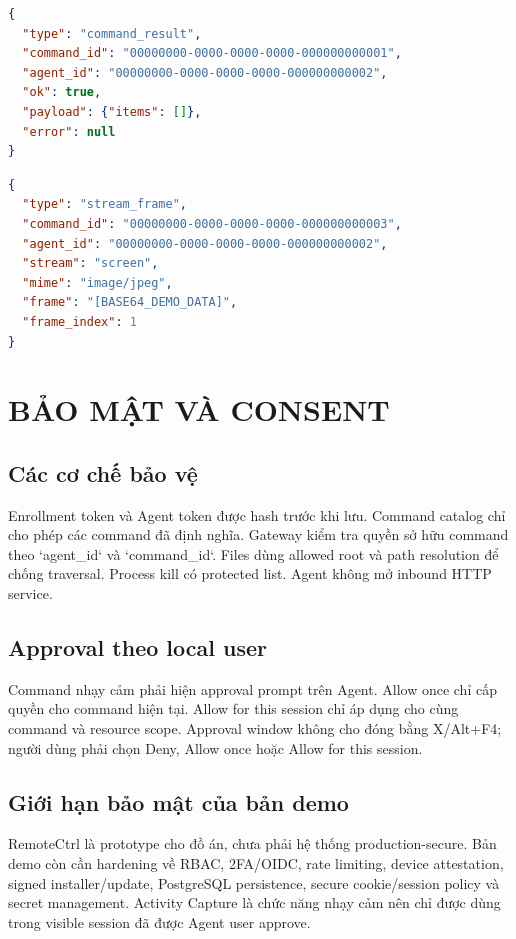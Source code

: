 \documentclass[12pt,a4paper]{article}
\begin{document}
\begin{lstlisting}[language=json,caption={Command result với dữ liệu giả}]
{
  "type": "command_result",
  "command_id": "00000000-0000-0000-0000-000000000001",
  "agent_id": "00000000-0000-0000-0000-000000000002",
  "ok": true,
  "payload": {"items": []},
  "error": null
}
\end{lstlisting}

\begin{lstlisting}[language=json,caption={Stream frame với dữ liệu giả}]
{
  "type": "stream_frame",
  "command_id": "00000000-0000-0000-0000-000000000003",
  "agent_id": "00000000-0000-0000-0000-000000000002",
  "stream": "screen",
  "mime": "image/jpeg",
  "frame": "[BASE64_DEMO_DATA]",
  "frame_index": 1
}
\end{lstlisting}

\section{BẢO MẬT VÀ CONSENT}

\subsection{Các cơ chế bảo vệ}

Enrollment token và Agent token được hash trước khi lưu. Command catalog chỉ cho phép các command đã định nghĩa. Gateway kiểm tra quyền sở hữu command theo `agent_id` và `command_id`. Files dùng allowed root và path resolution để chống traversal. Process kill có protected list. Agent không mở inbound HTTP service.

\subsection{Approval theo local user}

Command nhạy cảm phải hiện approval prompt trên Agent. Allow once chỉ cấp quyền cho command hiện tại. Allow for this session chỉ áp dụng cho cùng command và resource scope. Approval window không cho đóng bằng X/Alt+F4; người dùng phải chọn Deny, Allow once hoặc Allow for this session.

\subsection{Giới hạn bảo mật của bản demo}

RemoteCtrl là prototype cho đồ án, chưa phải hệ thống production-secure. Bản demo còn cần hardening về RBAC, 2FA/OIDC, rate limiting, device attestation, signed installer/update, PostgreSQL persistence, secure cookie/session policy và secret management. Activity Capture là chức năng nhạy cảm nên chỉ được dùng trong visible session đã được Agent user approve.
\end{document}
